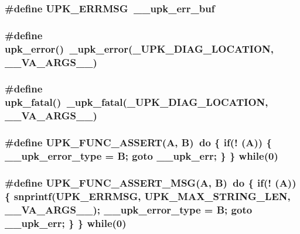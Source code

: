 \subsubsection{\setlength{\rightskip}{0pt plus 5cm}\#define UPK\_\-ERRMSG~\_\-\_\-upk\_\-err\_\-buf}\label{group__upk__errors_g8f863380b91a8f786f849261c3611a27}


\subsubsection{\setlength{\rightskip}{0pt plus 5cm}\#define upk\_\-error()~\_\-upk\_\-error(\_\-UPK\_\-DIAG\_\-LOCATION, \_\-\_\-VA\_\-ARGS\_\-\_\-)}\label{group__upk__errors_g27b090503575f3a1ee3c796f8b8ef7e8}


\subsubsection{\setlength{\rightskip}{0pt plus 5cm}\#define upk\_\-fatal()~\_\-upk\_\-fatal(\_\-UPK\_\-DIAG\_\-LOCATION, \_\-\_\-VA\_\-ARGS\_\-\_\-)}\label{group__upk__errors_g26ba69f2a5d79760a074951bcbe9559b}


\subsubsection{\setlength{\rightskip}{0pt plus 5cm}\#define UPK\_\-FUNC\_\-ASSERT(A, B)~do \{ if(! (A)) \{ \_\-\_\-upk\_\-error\_\-type = B; goto \_\-\_\-upk\_\-err; \} \} while(0)}\label{group__upk__errors_ge74b6ada05878c7921c0a022bbfb4e5b}


\subsubsection{\setlength{\rightskip}{0pt plus 5cm}\#define UPK\_\-FUNC\_\-ASSERT\_\-MSG(A, B)~do \{ if(! (A)) \{ snprintf(UPK\_\-ERRMSG, UPK\_\-MAX\_\-STRING\_\-LEN, \_\-\_\-VA\_\-ARGS\_\-\_\-); \_\-\_\-upk\_\-error\_\-type = B; goto \_\-\_\-upk\_\-err; \} \} while(0)}\label{group__upk__errors_ge32920b8438edda61aec14de4693ec55}



